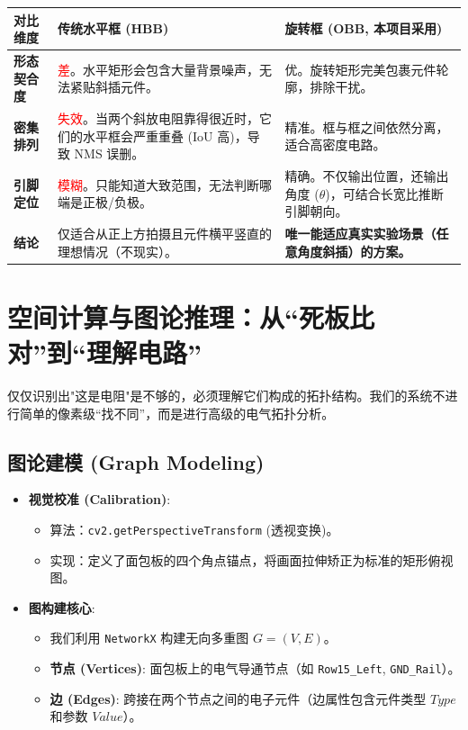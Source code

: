 \documentclass[a4paper,AutoFakeBold,oneside,12pt]{book}
\begin{document}
\begin{longtable}{|p{}|p{}|p{}|}
\hline
\textbf{对比维度} & \textbf{传统水平框 (HBB)} & \textbf{旋转框 (OBB, 本项目采用)} \\ \hline
\textbf{形态契合度} & \textcolor{red}{差}。水平矩形会包含大量背景噪声，无法紧贴斜插元件。 & \textcolor{green!60!black}{优}。旋转矩形完美包裹元件轮廓，排除干扰。 \\ \hline
\textbf{密集排列} & \textcolor{red}{失效}。当两个斜放电阻靠得很近时，它们的水平框会严重重叠 (IoU 高)，导致 NMS 误删。 & \textcolor{green!60!black}{精准}。框与框之间依然分离，适合高密度电路。 \\ \hline
\textbf{引脚定位} & \textcolor{red}{模糊}。只能知道大致范围，无法判断哪端是正极/负极。 & \textcolor{green!60!black}{精确}。不仅输出位置，还输出角度 ($\theta$)，可结合长宽比推断引脚朝向。 \\ \hline
\textbf{结论} & 仅适合从正上方拍摄且元件横平竖直的理想情况（不现实）。 & \textbf{唯一能适应真实实验场景（任意角度斜插）的方案。} \\ \hline
\end{longtable}

\section{空间计算与图论推理：从“死板比对”到“理解电路”}
仅仅识别出"这是电阻"是不够的，必须理解它们构成的拓扑结构。我们的系统不进行简单的像素级“找不同”，而是进行高级的电气拓扑分析。

\subsection{图论建模 (Graph Modeling)}
\begin{itemize}
    \item \textbf{视觉校准 (Calibration)}:
    \begin{itemize}
        \item 算法：\texttt{cv2.getPerspectiveTransform} (透视变换)。
        \item 实现：定义了面包板的四个角点锚点，将画面拉伸矫正为标准的矩形俯视图。
    \end{itemize}
    \item \textbf{图构建核心}:
    \begin{itemize}
        \item 我们利用 \texttt{NetworkX} 构建无向多重图 $G=(V, E)$。
        \item \textbf{节点 (Vertices)}: 面包板上的电气导通节点（如 \texttt{Row15\_Left}, \texttt{GND\_Rail}）。
        \item \textbf{边 (Edges)}: 跨接在两个节点之间的电子元件（边属性包含元件类型 $Type$ 和参数 $Value$）。
    \end{itemize}
\end{itemize}
\end{document}
